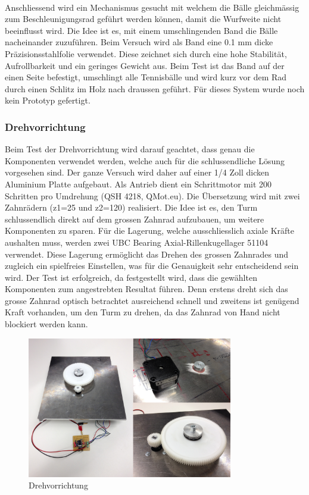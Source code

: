 \noindent
\\Anschliessend wird ein Mechanismus gesucht mit welchem die Bälle 
gleichmässig zum Beschleunigungsrad geführt werden können, damit die Wurfweite 
nicht beeinflusst wird. Die Idee ist es, mit einem umschlingenden Band die 
Bälle nacheinander zuzuführen. Beim Versuch wird als Band eine 0.1 mm dicke 
Präzisionsstahlfolie verwendet. Diese zeichnet sich durch eine hohe Stabilität, 
Aufrollbarkeit und ein geringes Gewicht aus. Beim Test ist das Band auf der 
einen Seite befestigt, umschlingt alle Tennisbälle und wird kurz vor dem Rad 
durch einen Schlitz im Holz nach draussen geführt. Für dieses System wurde noch kein Prototyp gefertigt. \\


\subsubsection{Drehvorrichtung}
Beim Test der Drehvorrichtung wird darauf geachtet, dass genau die Komponenten 
verwendet werden, welche auch für die schlussendliche Lösung vorgesehen sind. 
Der ganze Versuch wird daher auf einer 1/4 Zoll dicken Aluminium Platte 
aufgebaut. Als Antrieb dient ein Schrittmotor mit 200 Schritten pro Umdrehung 
(QSH 4218, QMot.eu). Die Übersetzung wird mit zwei Zahnrädern (z1=25 und z2=120) 
realisiert. Die Idee ist es, den Turm schlussendlich direkt auf dem grossen 
Zahnrad aufzubauen, um weitere Komponenten zu sparen. Für die Lagerung, welche 
ausschliesslich axiale Kräfte aushalten muss, werden zwei UBC Bearing 
Axial-Rillenkugellager 51104 verwendet. Diese Lagerung ermöglicht das Drehen 
des grossen Zahnrades und zugleich ein spielfreies Einstellen, was für die 
Genauigkeit sehr entscheidend sein wird.
Der Test ist erfolgreich, da festgestellt wird, dass die gewählten Komponenten zum angestrebten Resultat führen. Denn erstens dreht sich das grosse Zahnrad optisch betrachtet ausreichend schnell und zweitens ist genügend Kraft vorhanden, um den Turm zu drehen, da das Zahnrad von Hand nicht blockiert werden kann.

\begin{figure}[h!]          
	\centering             
	\includegraphics[width=0.8\textwidth]{fig/Drehvorrichtung.png}    
	\caption{Drehvorrichtung}
	
	\label{fig:Drehvorrichtung}
\end{figure}
\noindent




